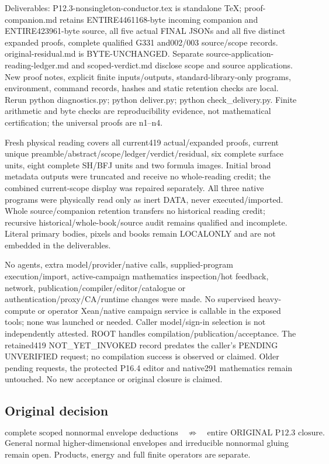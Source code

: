 Deliverables: P12.3-nonsingleton-conductor.tex is standalone TeX; proof-companion.md retains ENTIRE4461168-byte incoming companion and ENTIRE423961-byte source, all five actual FINAL JSONs and all five distinct expanded proofs, complete qualified G331 and002/003 source/scope records. original-residual.md is BYTE-UNCHANGED. Separate source-application-reading-ledger.md and scoped-verdict.md disclose scope and source applications. New proof notes, explicit finite inputs/outputs, standard-library-only programs, environment, command records, hashes and static retention checks are local. Rerun python diagnostics.py; python deliver.py; python check\_delivery.py. Finite arithmetic and byte checks are reproducibility evidence, not mathematical certification; the universal proofs are n1--n4.

Fresh physical reading covers all current419 actual/expanded proofs, current unique preamble/abstract/scope/ledger/verdict/residual, six complete surface units, eight complete SH/BFJ units and two formula images. Initial broad metadata outputs were truncated and receive no whole-reading credit; the combined current-scope display was repaired separately. All three native programs were physically read only as inert DATA, never executed/imported. Whole source/companion retention transfers no historical reading credit; recursive historical/whole-book/source audit remains qualified and incomplete. Literal primary bodies, pixels and books remain LOCALONLY and are not embedded in the deliverables.

No agents, extra model/provider/native calls, supplied-program execution/import, active-campaign mathematics inspection/hot feedback, network, publication/compiler/editor/catalogue or authentication/proxy/CA/runtime changes were made. No supervised heavy-compute or operator Xean/native campaign service is callable in the exposed tools; none was launched or needed. Caller model/sign-in selection is not independently attested. ROOT handles compilation/publication/acceptance. The retained419 NOT\_YET\_INVOKED record predates the caller's PENDING UNVERIFIED request; no compilation success is observed or claimed. Older pending requests, the protected P16.4 editor and native291 mathematics remain untouched. No new acceptance or original closure is claimed.

\subsection*{Original decision}
\[
 \text{complete scoped nonnormal envelope deductions}
 \quad\not\Longrightarrow\quad\text{entire ORIGINAL P12.3 closure}.
\]
General normal higher-dimensional envelopes and irreducible nonnormal
gluing remain open. Products, energy and full finite operators are separate.

